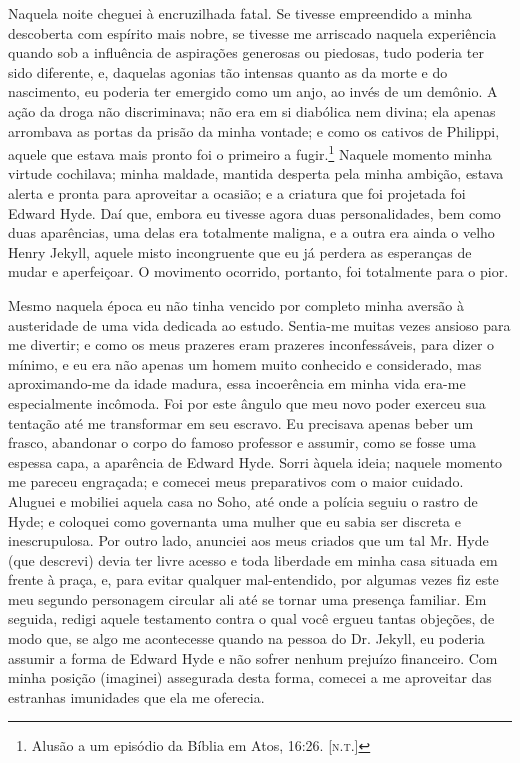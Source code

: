Naquela noite cheguei à encruzilhada fatal.  Se tivesse empreendido a
minha descoberta com espírito mais nobre, se tivesse me arriscado
naquela experiência quando sob a influência de aspirações generosas ou
piedosas, tudo poderia ter sido diferente, e, daquelas agonias tão
intensas quanto as da morte e do nascimento, eu poderia ter emergido
como um anjo, ao invés de um demônio.  A ação da droga não
discriminava; não era em si diabólica nem divina; ela apenas arrombava
as portas da prisão da minha vontade; e como os cativos de Philippi,		%
aquele que estava mais pronto foi o primeiro a fugir.\footnote{ Alusão a um episódio da
Bíblia em Atos, 16:26. [\textsc{n.t.}]} Naquele momento minha virtude cochilava; minha maldade, mantida
desperta pela minha ambição, estava alerta e pronta para aproveitar a
ocasião; e a criatura que foi projetada foi Edward Hyde.  Daí que,
embora eu tivesse agora duas personalidades, bem como duas aparências,
uma delas era totalmente maligna, e a outra era ainda o velho Henry
Jekyll, aquele misto incongruente que eu já perdera as esperanças de
mudar e aperfeiçoar.  O movimento ocorrido, portanto, foi totalmente
para o pior.

Mesmo naquela época eu não tinha vencido por completo minha aversão à
austeridade de uma vida dedicada ao estudo.  Sentia-me muitas vezes
ansioso para me divertir; e como os meus prazeres eram prazeres
inconfessáveis, para dizer o mínimo, e eu era não apenas um homem muito
conhecido e considerado, mas aproximando-me da idade madura, essa
incoerência em minha vida era-me especialmente incômoda.  Foi por este
ângulo que meu novo poder exerceu sua tentação até me transformar em
seu escravo.  Eu precisava apenas beber um frasco, abandonar o corpo do
famoso professor e assumir, como se fosse uma espessa capa, a aparência
de Edward Hyde.  Sorri àquela ideia; naquele momento me pareceu
engraçada; e comecei meus preparativos com o maior cuidado.  Aluguei e
mobiliei aquela casa no Soho, até onde a polícia seguiu o rastro de Hyde; e
coloquei como governanta uma mulher que eu sabia ser discreta e
inescrupulosa.  Por outro lado, anunciei aos meus criados que um tal
Mr. Hyde (que descrevi) devia ter livre acesso e toda liberdade em
minha casa situada em frente à praça, e, para evitar qualquer
mal-entendido, por algumas vezes fiz este meu segundo personagem
circular ali até se tornar uma presença familiar.  Em seguida, redigi
aquele testamento contra o qual você ergueu tantas objeções, de modo
que, se algo me acontecesse quando na pessoa do Dr. Jekyll, eu poderia
assumir a forma de Edward Hyde e não sofrer nenhum prejuízo financeiro.
 Com minha posição (imaginei) assegurada desta forma, comecei a me
aproveitar das estranhas imunidades que ela me oferecia.

